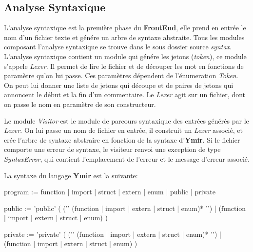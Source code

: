 \documentclass[a4paper, 11pt]{article}
\begin{document}
\subsection {Analyse Syntaxique}

L'analyse syntaxique est la première phase du \textbf{FrontEnd}, elle prend en entrée le nom d'un fichier texte et génére un arbre de syntaxe abstraite. Tous les modules composant l'analyse syntaxique se trouve dans le sous dossier source \textit {syntax}. L'analyse syntaxique contient un module qui génére les jetons (\textit {token}), ce module s'appele \textit{Lexer}. Il permet de lire le fichier et de découper les mot en fonctions de paramètre qu'on lui passe. Ces paramètres dépendent de l'énumeration \textit {Token}. On peut lui donner une liste de jetons qui découpe et de paires de jetons qui annoncent le début et la fin d'un commentaire. Le \textit {Lexer} agit sur un fichier, dont on passe le nom en paramètre de son constructeur.
\bigskip

Le module \textit {Visitor} est le module de parcours syntaxique des entrées générés par le \textit{Lexer}. On lui passe un nom de fichier en entrée, il construit un \textit {Lexer} associé, et crée l'arbre de syntaxe abstraire en fonction de la syntaxe d'\textbf{Ymir}. Si le fichier comporte une erreur de syntaxe, le visiteur renvoi une exception de type \textit {SyntaxError}, qui contient l'emplacement de l'erreur et le message d'erreur associé.
\bigskip

La syntaxe du langage \textbf{Ymir} est la suivante:
\smallskip

\begin{boxedverbatim}
  program := function | import | struct | extern | enum | public | private
  
  public := 'public' (
                       ('{' (function | import | extern | struct | enum)* '}')
                       | (function | import | extern | struct | enum)
                     )

  private := 'private' (
                       ('{' (function | import | extern | struct | enum)* '}')
                       | (function | import | extern | struct | enum)
                     )
\end{boxedverbatim}
\end{document}
